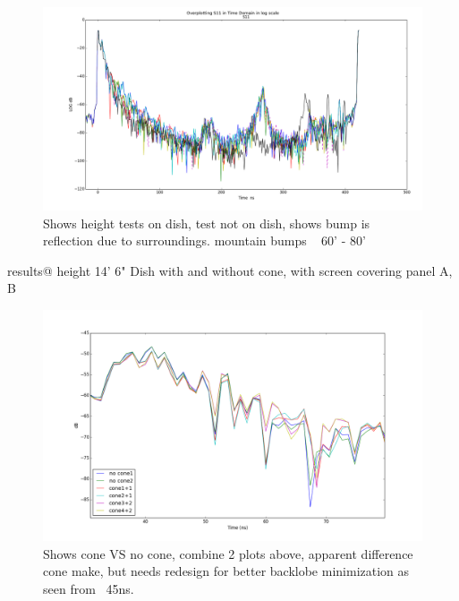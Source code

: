 \documentclass[preprint]{aastex}  %
\begin{document}
\begin{figure}[H]
	\begin{center}
	\includegraphics[width =\textwidth]{./reflectometry_plots/Mar28/s11all-mar28mix17set1}
	\caption{Shows height tests on dish, test not on dish, shows bump is reflection due to surroundings. mountain bumps ~ 60' - 80'
\label{Fig:moutain} }
	\end{center}
\end{figure}


results@ height 14' 6"
Dish with and without cone, with screen covering panel A, B

\begin{figure}[H]
	\begin{center}
	\includegraphics[width =\textwidth]{reflectometry_plots/May5/S11_1st2nd_refl}
	\caption{Shows cone VS no cone, combine 2 plots above, apparent difference cone make, but needs redesign for better backlobe minimization as seen from ~45ns.
\label{Fig:conetest} }
	\end{center}
\end{figure}
\end{document}
